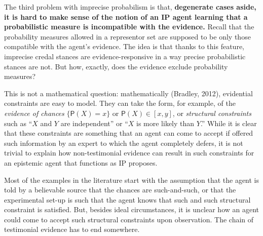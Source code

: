 \documentclass[
  10pt,
  dvipsnames,enabledeprecatedfontcommands]{scrartcl}
\begin{document}
The third problem with imprecise probabilism is that, \textbf{degenerate
cases aside, it is hard to make sense of the notion of an IP agent
learning that a probabilistic measure is incompatible with the
evidence.} Recall that the probability measures allowed in a representor
set are supposed to be only those compatible with the agent's evidence.
The idea is that thanks to this feature, imprecise credal stances are
evidence-responsive in a way precise probabilistic stances are not. But
how, exactly, does the evidence exclude probability measures?

This is not a mathematical question: mathematically (Bradley, 2012),
evidential constraints are easy to model. They can take the form, for
example, of the \emph{evidence of chances} \(\{ \mathsf{P}(X) = x\}\) or
\(\mathsf{P}(X) \in [x,y]\), or \emph{structural constraints} such as
``\(X\) and \(Y\) are independent'' or ``\(X\) is more likely than
\(Y\).'' While it is clear that these constraints are something that an
agent can come to accept if offered such information by an expert to
which the agent completely defers, it is not trivial to explain how
non-testimonial evidence can result in such constraints for an epistemic
agent that functions as IP proposes.

Most of the examples in the literature start with the assumption that
the agent is told by a believable source that the chances are
such-and-such, or that the experimental set-up is such that the agent
knows that such and such structural constraint is satisfied. But,
besides ideal circumstances, it is unclear how an agent could come to
accept such structural constraints upon observation. The chain of
testimonial evidence has to end somewhere.
\end{document}
